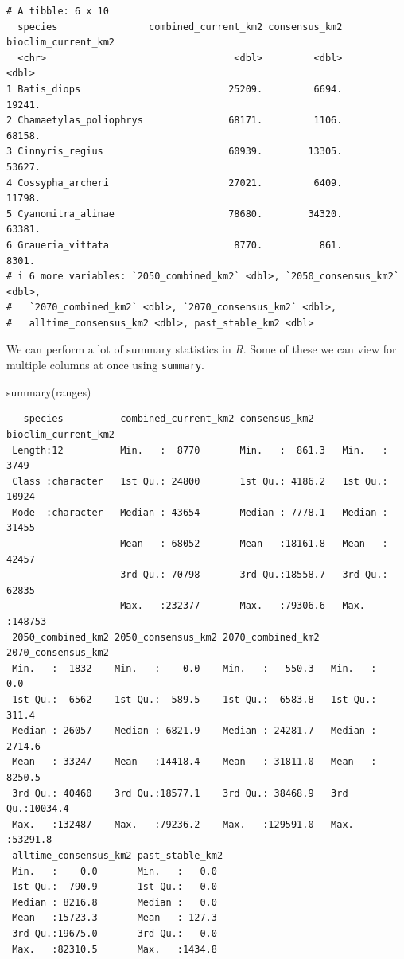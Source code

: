 \documentclass[
  letterpaper,
  DIV=11,
  numbers=noendperiod]{scrreprt}
\newenvironment{Shaded}{\begin{snugshade}}{\end{snugshade}}
\newcommand{\FunctionTok}[1]{\textcolor[rgb]{0.28,0.35,0.67}{#1}}
\newcommand{\NormalTok}[1]{\textcolor[rgb]{0.00,0.23,0.31}{#1}}
\begin{document}
\begin{verbatim}
# A tibble: 6 x 10
  species                combined_current_km2 consensus_km2 bioclim_current_km2
  <chr>                                 <dbl>         <dbl>               <dbl>
1 Batis_diops                          25209.         6694.              19241.
2 Chamaetylas_poliophrys               68171.         1106.              68158.
3 Cinnyris_regius                      60939.        13305.              53627.
4 Cossypha_archeri                     27021.         6409.              11798.
5 Cyanomitra_alinae                    78680.        34320.              63381.
6 Graueria_vittata                      8770.          861.               8301.
# i 6 more variables: `2050_combined_km2` <dbl>, `2050_consensus_km2` <dbl>,
#   `2070_combined_km2` <dbl>, `2070_consensus_km2` <dbl>,
#   alltime_consensus_km2 <dbl>, past_stable_km2 <dbl>
\end{verbatim}

We can perform a lot of summary statistics in \emph{R}. Some of these we
can view for multiple columns at once using \texttt{summary}.

\begin{Shaded}
\begin{Highlighting}[]
\FunctionTok{summary}\NormalTok{(ranges)}
\end{Highlighting}
\end{Shaded}

\begin{verbatim}
   species          combined_current_km2 consensus_km2     bioclim_current_km2
 Length:12          Min.   :  8770       Min.   :  861.3   Min.   :  3749     
 Class :character   1st Qu.: 24800       1st Qu.: 4186.2   1st Qu.: 10924     
 Mode  :character   Median : 43654       Median : 7778.1   Median : 31455     
                    Mean   : 68052       Mean   :18161.8   Mean   : 42457     
                    3rd Qu.: 70798       3rd Qu.:18558.7   3rd Qu.: 62835     
                    Max.   :232377       Max.   :79306.6   Max.   :148753     
 2050_combined_km2 2050_consensus_km2 2070_combined_km2  2070_consensus_km2
 Min.   :  1832    Min.   :    0.0    Min.   :   550.3   Min.   :    0.0   
 1st Qu.:  6562    1st Qu.:  589.5    1st Qu.:  6583.8   1st Qu.:  311.4   
 Median : 26057    Median : 6821.9    Median : 24281.7   Median : 2714.6   
 Mean   : 33247    Mean   :14418.4    Mean   : 31811.0   Mean   : 8250.5   
 3rd Qu.: 40460    3rd Qu.:18577.1    3rd Qu.: 38468.9   3rd Qu.:10034.4   
 Max.   :132487    Max.   :79236.2    Max.   :129591.0   Max.   :53291.8   
 alltime_consensus_km2 past_stable_km2 
 Min.   :    0.0       Min.   :   0.0  
 1st Qu.:  790.9       1st Qu.:   0.0  
 Median : 8216.8       Median :   0.0  
 Mean   :15723.3       Mean   : 127.3  
 3rd Qu.:19675.0       3rd Qu.:   0.0  
 Max.   :82310.5       Max.   :1434.8  
\end{verbatim}
\end{document}
